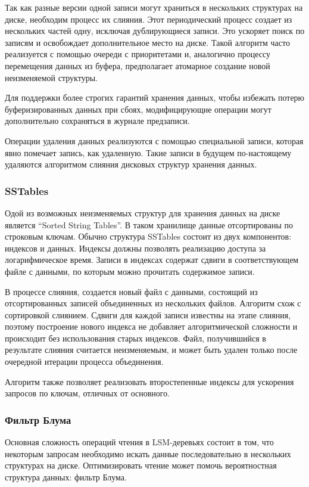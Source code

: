 \documentclass[14pt, russian]{scrartcl}
\begin{document}
Так как разные версии одной записи могут храниться в нескольких структурах на
диске, необходим процесс их слияния. Этот периодический процесс создает из
нескольких частей одну, исключая дублирующиеся записи. Это ускоряет поиск по
записям и освобождает дополнительное место на диске. Такой алгоритм часто
реализуется с помощью очереди с приоритетами и, аналогично процессу перемещения
данных из буфера, предполагает атомарное создание новой неизменяемой структуры.

Для поддержки более строгих гарантий хранения данных, чтобы избежать потерю
буферизированных данных при сбоях, модифицирующие операции могут дополнительно
сохраняться в журнале предзаписи.

Операции удаления данных реализуются с помощью специальной записи, которая явно
помечает запись, как удаленную. Такие записи в будущем по-настоящему удаляются
алгоритмом слияния дисковых структур хранения данных.

\subsubsection{SSTables}

Одой из возможных неизменяемых структур для хранения данных на диске является
``Sorted String Tables''. В таком хранилище данные отсортированы по строковым
ключам. Обычно структура SSTables состоит из двух компонентов: индексов и
данных. Индексы должны позволять реализацию доступа за логарифмическое время.
Записи в индексах содержат сдвиги в соответствующем файле с данными, по которым
можно прочитать содержимое записи.

В процессе слияния, создается новый файл с данными, состоящий из отсортированных
записей объединенных из нескольких файлов. Алгоритм схож с сортировкой слиянием.
Сдвиги для каждой записи известны на этапе слияния, поэтому построение нового
индекса не добавляет алгоритмической сложности и происходит без использования
старых индексов. Файл, получившийся в результате слияния считается неизменяемым,
и может быть удален только после очередной итерации процесса объединения.

Алгоритм также позволяет реализовать второстепенные индексы для ускорения
запросов по ключам, отличных от основного.

\subsubsection{Фильтр Блума}

Основная сложность операций чтения в LSM-деревьях состоит в том, что некоторым
запросам необходимо искать данные последовательно в нескольких структурах на
диске. Оптимизировать чтение может помочь вероятностная структура данных: фильтр
Блума.
\end{document}
